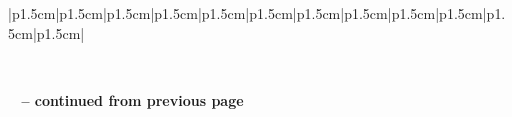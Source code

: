 \documentclass{article}
\begin{document}
\renewcommand{\thesubsection}{\thesection.\alph{subsection}}
\newcommand{\scripty}[1]{\ensuremath{\mathcalligra{#1}}\;}
\newcommand*\VF[1]{\mathbf{#1}}
\newcommand*\dif{\mathop{}\!\mathrm{d}}
\newcommand{\Lagr}{\mathcal{L}}
\newcommand{\Hami}{\mathcal{H}}
\newcommand{\elec}{4\pi\epsilon_0}

\begin{landscape}
\scriptsize
\begin{longtable}{|p{1.5cm}|p{1.5cm}|p{1.5cm}|p{1.5cm}|p{1.5cm}|p{1.5cm}|p{1.5cm}|p{1.5cm}|p{1.5cm}|p{1.5cm}|p{1.5cm}|p{1.5cm}|}
\caption{HCal LED Plateaus and Alphas}\label{tab:hcalalphas} \\
\hline
\endfirsthead

%
{{\bfseries \tablename\ \thetable{} -- continued from previous page}} \\
\hline
\endhead

\hline
{} \\ \hline
\endfoot


\end{longtable}
\end{landscape}
\end{document}

